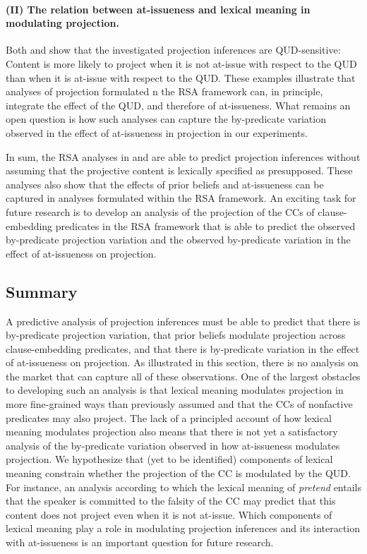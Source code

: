 \documentclass[11pt,fleqn]{article}
\newcommand{\6}{\mbox{$[\hspace*{-.6mm}[$}}
\newcommand{\9}{\mbox{$]\hspace*{-.6mm}]$}}
\begin{document}
\paragraph{(II) The relation between at-issueness and lexical meaning in modulating projection.} Both \citealt{qing-etal2016} and \citealt{warstadt2022} show that the investigated projection inferences are QUD-sensitive: Content is more likely to project when it is not at-issue with respect to the QUD than when it is at-issue with respect to the QUD. These examples illustrate that analyses of projection formulated n the RSA framework can, in principle, integrate the effect of the QUD, and therefore of at-issueness. What remains an open question is how such analyses can capture the by-predicate variation observed in the effect of at-issueness in projection in our experiments. 

\bigskip

In sum, the RSA analyses in \citealt{qing-etal2016} and \citealt{warstadt2022} are able to predict projection inferences without assuming that the projective content is lexically specified as presupposed. These analyses also show that the effects of prior beliefs and at-issueness can be captured in analyses formulated within the RSA framework. An exciting task for future research is to develop an analysis of the projection of the CCs of clause-embedding predicates in the RSA framework that is able to predict the observed by-predicate projection variation and the observed by-predicate variation in the effect of at-issueness on projection.


\subsection{Summary}

A predictive analysis of projection inferences must be able to predict that there is by-predicate projection variation, that prior beliefs modulate projection across clause-embedding predicates, and that there is by-predicate variation in the effect of at-issueness on projection. As illustrated in this section, there is no analysis on the market that can capture all of these observations. One of the largest obstacles to developing such an analysis is that lexical meaning modulates projection in more fine-grained ways than previously assumed and that the CCs of nonfactive predicates may also project. The lack of a principled account of how lexical meaning modulates projection also means that there is not yet a satisfactory analysis of the by-predicate variation observed in how at-issueness modulates projection. We hypothesize that (yet to be identified) components of lexical meaning constrain whether the projection of the CC  is modulated by the QUD. For instance, an analysis according to which the lexical meaning of {\em pretend} entails that the speaker is committed to the falsity of the CC may predict that this content does not project even when it is not at-issue. Which components of lexical meaning play a role in modulating projection inferences and its interaction with at-issueness is an important question for future research.
\end{document}

